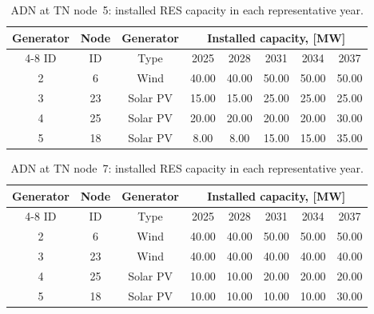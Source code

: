 \documentclass[preprint,12pt]{elsarticle}
\begin{document}
\begin{table}[htbp!]
    \centering
    \caption{ADN at TN node~5: installed RES capacity in each representative year.}
    \begin{tabular}{ccc ccccc}
        \toprule
        Generator   & Node  & Generator & \multicolumn{5}{c}{Installed capacity, [MW]}\\  \cmidrule{4-8}
        ID          & ID    & Type      & 2025  & 2028  & 2031  & 2034   & 2037 \\ 
        \midrule
        2 & 6  &  Wind    & 40.00 & 40.00 & 50.00 & 50.00 & 50.00\\
        3 & 23 & Solar PV & 15.00 & 15.00 & 25.00 & 25.00 & 25.00\\
        4 & 25 & Solar PV & 20.00 & 20.00 & 20.00 & 20.00 & 30.00\\
        5 & 18 & Solar PV & 8.00  & 8.00  & 15.00 & 15.00 & 35.00\\
        \bottomrule
    \end{tabular}
    \label{tab:cs3_adn_node_5_res_generators}
\end{table}

\begin{table}[htbp!]
    \centering
    \caption{ADN at TN node~7: installed RES capacity in each representative year.}
    \begin{tabular}{ccc ccccc}
        \toprule
        Generator   & Node  & Generator & \multicolumn{5}{c}{Installed capacity, [MW]}\\  \cmidrule{4-8}
        ID          & ID    & Type      & 2025  & 2028  & 2031  & 2034   & 2037 \\ 
        \midrule
        2 & 6  & Wind     & 40.00 & 40.00 & 50.00 & 50.00 & 50.00\\
        3 & 23 & Wind     & 40.00 & 40.00 & 40.00 & 40.00 & 40.00\\
        4 & 25 & Solar PV & 10.00 & 10.00 & 20.00 & 20.00 & 20.00\\
        5 & 18 & Solar PV & 10.00 & 10.00 & 10.00 & 10.00 & 30.00\\
        \bottomrule
    \end{tabular}
    \label{tab:cs3_adn_node_7_res_generators}
\end{table}
\end{document}
